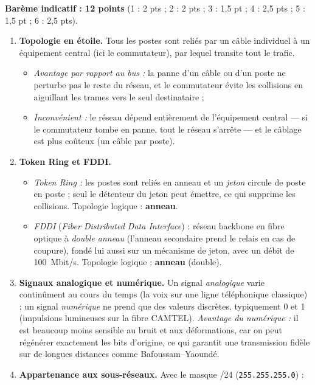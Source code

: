 \documentclass[11pt]{article}
\newcommand{\cle}[1]{{\popxbold\color{popdark}#1}}
\begin{document}
\begin{corrige}
\textbf{Barème indicatif : 12 points} (1 : 2 pts ; 2 : 2 pts ; 3 : 1,5 pt ; 4 : 2,5 pts ; 5 : 1,5 pt ; 6 : 2,5 pts).
\begin{enumerate}
\item \textbf{Topologie en étoile.} Tous les postes sont reliés par un câble individuel à un équipement central (ici le commutateur), par lequel transite tout le trafic.
\begin{itemize}
\item \emph{Avantage par rapport au bus :} la panne d'un câble ou d'un poste ne perturbe pas le reste du réseau, et le commutateur évite les collisions en aiguillant les trames vers le seul destinataire ;
\item \emph{Inconvénient :} le réseau dépend entièrement de l'équipement central — si le commutateur tombe en panne, tout le réseau s'arrête — et le câblage est plus coûteux (un câble par poste).
\end{itemize}
\item \textbf{\cle{Token Ring} et \cle{FDDI}.}
\begin{itemize}
\item \emph{Token Ring :} les postes sont reliés en anneau et un \emph{jeton} circule de poste en poste ; seul le détenteur du jeton peut émettre, ce qui supprime les collisions. Topologie logique : \textbf{anneau}.
\item \emph{FDDI} (\emph{Fiber Distributed Data Interface}) : réseau backbone en fibre optique à \emph{double anneau} (l'anneau secondaire prend le relais en cas de coupure), fondé lui aussi sur un mécanisme de jeton, avec un débit de \SI{100}{Mbit/s}. Topologie logique : \textbf{anneau} (double).
\end{itemize}
\item \textbf{Signaux analogique et numérique.} Un signal \emph{analogique} varie continûment au cours du temps (la voix sur une ligne téléphonique classique) ; un signal \emph{numérique} ne prend que des valeurs discrètes, typiquement 0 et 1 (impulsions lumineuses sur la fibre \cle{CAMTEL}). \emph{Avantage du numérique :} il est beaucoup moins sensible au bruit et aux déformations, car on peut régénérer exactement les bits d'origine, ce qui garantit une transmission fidèle sur de longues distances comme Bafoussam–Yaoundé.
\item \textbf{Appartenance aux sous-réseaux.} Avec le masque /24 (\texttt{255.255.255.0}) :
\begin{align*}

\end{align*}
\end{enumerate}
\end{corrige}
\end{document}
